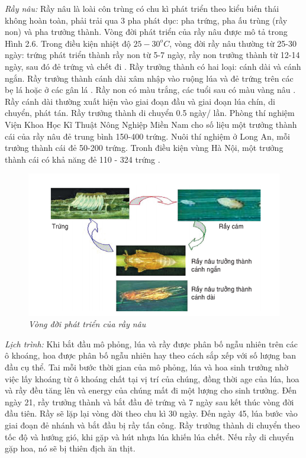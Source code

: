 \documentclass[13pt]{extreport}
\begin{document}
{\textit{Rầy nâu:} Rầy nâu là loài côn trùng có chu kì phát triển theo kiểu biến thái không hoàn toàn, phải trải qua 3 pha phát dục: pha trứng, pha ấu trùng (rầy non) và pha trưởng thành. Vòng đời phát triển của rầy nâu được mô tả trong Hình 2.6. Trong điều kiện nhiệt độ $25-30^o C$, vòng đời rầy nâu thường từ 25-30 ngày: trứng phát triển thành rầy non từ 5-7 ngày, rầy non trưởng thành từ 12-14 ngày, sau đó đẻ trứng và chết đi \cite{sachhd1}. Rầy trưởng thành có hai loại: cánh dài và cánh ngắn. Rầy trưởng thành cánh dài xâm nhập vào ruộng lúa và đẻ trứng trên các bẹ lá hoặc ở các gân lá \cite{sachhd2}. Rầy non có màu trắng, các tuổi sau có màu vàng nâu \cite{sachhd2}. Rầy cánh dài thường xuất hiện vào giai đoạn đầu và giai đoạn lúa chín, di chuyển, phát tán. Rầy trưởng thành di chuyển 0.5 ngày/ lần. Phòng thí nghiệm Viện Khoa Học Kĩ Thuật Nông Nghiệp Miền Nam cho số liệu một trưởng thành cái của rầy nâu đẻ trung bình 150-400 trứng. Nuôi thí nghiệm ở Long An, mỗi trưởng thành cái đẻ 50-200 trứng. Tronh điều kiện vùng Hà Nội, một trưởng thành cái có khả năng đẻ 110 - 324 trứng \cite{sachhd1}.

\begin{figure}
\begin{center}
\includegraphics[scale=0.8]{vongdoiray}
\end{center}
\caption{\textit{Vòng đời phát triển của rầy nâu}}
\end{figure}

\textit{Lịch trình:} Khi bắt đầu mô phỏng, lúa và rầy được phân bố ngẫu nhiên trên các ô khoáng, hoa được phân bố ngẫu nhiên hay theo cách sắp xếp với số lượng ban đầu cụ thể. Tai mỗi bước thời gian của mô phỏng, lúa và hoa sinh trưởng nhờ việc lấy khoáng từ ô khoáng chất tại vị trí của chúng, đồng thời age của lúa, hoa và rầy đều tăng lên và energy của chúng mất đi một lượng cho sinh trưởng. Đến ngày 21, rầy trưởng thành và bắt đầu đẻ trứng và 7 ngày sau kết thúc vòng đời đầu tiên. Rầy sẽ lặp lại vòng đời theo chu kì 30 ngày. Đến ngày 45, lúa bước vào giai đoạn đẻ nhánh và bắt đầu bị rầy tấn công. Rầy trưởng thành di chuyển theo tốc độ và hướng gió, khi gặp và hút nhựa lúa khiến lúa chết. Nếu rầy di chuyển gặp hoa, nó sẽ bị thiên địch ăn thịt.

}
\end{document}
